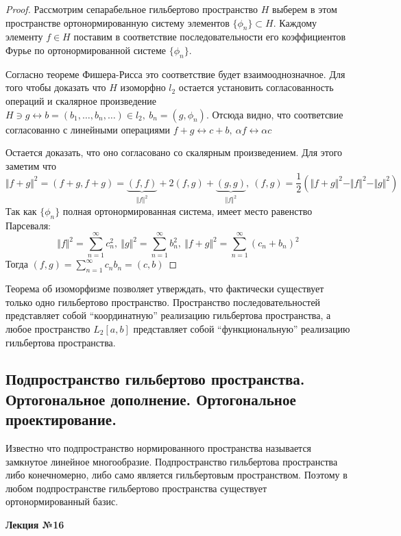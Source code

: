 \documentclass[14pt,a4paper]{extarticle}
\theoremstyle{definition}
\theoremstyle{remark}
\renewcommand{\[}{\begin{dmath*}[compact]}
\renewcommand{\]}{\end{dmath*}}
\newcommand{\sep}{ , \ \allowbreak }
\newcommand\fr[2]{\dfrac{#1}{#2}}
\begin{document}
\begin{proof}
  Рассмотрим сепарабельное гильбертово пространство $H$ выберем в этом
  пространстве ортонормированную систему элементов $\{\phi_n\} \subset H$.
  Каждому элементу $f \in H$ поставим в соответствие последовательности его
  коэффициентов Фурье по ортонормированной системе $\{\phi_n\}$.

  Согласно теореме Фишера-Рисса это соответствие будет взаимооднозначное.
  Для того чтобы доказать что $H$ изоморфно $l_2$ остается установить
  согласованность операций и скалярное произведение
  $H \ni g \leftrightarrow b = (b_1, \dots, b_n, \dots) \in l_2 \sep
  b_n= (g,\phi_n)$.
  Отсюда видно, что соответсвие согласованно с линейными операциями
  $f+g \leftrightarrow c+b \sep \alpha f \leftrightarrow \alpha c$

  Остается доказать, что оно согласовано со скалярным произведением.
  Для этого заметим что
  \[\Vert f+g \Vert ^ 2 = (f+g, f+g)
  = \underbrace{(f,f)}_{\Vert f \Vert^2} + 2(f,g)
    + \underbrace{(g,g)}_{\Vert f \Vert^2} \sep (f,g)
  = \fr{1}{2}(\Vert f+g \Vert ^2 - \Vert f \Vert^2 - \Vert g \Vert ^2)\]
  Так как $\{\phi_n\}$ полная ортонормированная система, имеет место
  равенство Парсеваля:
  \[\Vert f \Vert^2 = \sum_{n=1}^\infty c_n^2 \sep
  \Vert g \Vert^2 = \sum_{n=1}^\infty b_n^2 \sep
  \Vert f+g \Vert^2 = \sum_{n=1}^\infty(c_n+b_n)^2\]
  Тогда $(f,g) = \sum_{n=1}^\infty c_n b_n = (c,b)$
\end{proof}

Теорема об изоморфизме позволяет утверждать, что фактически существует только
одно гильбертово пространство. Пространство последовательностей представляет
собой ``координатную'' реализацию гильбертова пространства,
а любое пространство $L_2[a,b]$ представляет собой ``функциональную''
реализацию гильбертова пространства.

\subsection{Подпространство гильбертово пространства. Ортогональное дополнение.
Ортогональное проектирование.}

Известно что подпространство нормированного пространства называется
замкнутое линейное многообразие.
Подпространство гильбертова пространства либо конечномерно,
либо само является гильбертовым пространством.
Поэтому в любом подпространстве гильбертово пространства
существует ортонормированный базис.

\textbf{Лекция №16}
\end{document}
